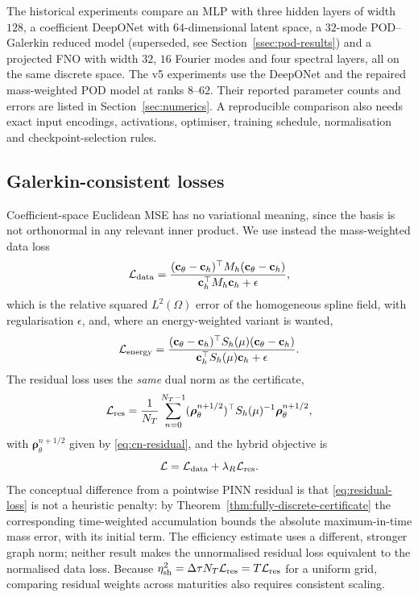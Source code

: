 \documentclass[11pt]{amsart}
\theoremstyle{remark}
\newcommand{\Mh}{M_h}
\newcommand{\Sh}{S_h}
\newcommand{\dt}{\Delta\tau}
\newcommand{\etaSharp}{\eta_{\mathrm{sh}}}
\newcommand{\cc}{\mathbf c}
\newcommand{\rr}{\bm\rho}
\begin{document}
The historical experiments compare an MLP with three hidden layers of width
$128$, a coefficient DeepONet with $64$-dimensional latent space, a
$32$-mode POD--Galerkin reduced model (superseded, see
Section~\ref{ssec:pod-results}) and a projected FNO with width $32$, $16$
Fourier modes and four spectral layers, all on the same discrete space. The
v5 experiments use the DeepONet and the repaired mass-weighted POD model at
ranks $8$--$62$.
Their reported parameter counts and errors are listed in
Section~\ref{sec:numerics}. A reproducible comparison also needs exact
input encodings, activations, optimiser, training schedule, normalisation
and checkpoint-selection rules.

\subsection{Galerkin-consistent losses}
\label{ssec:losses}

Coefficient-space Euclidean MSE has no variational meaning, since the basis is
not orthonormal in any relevant inner product.  We use instead the
mass-weighted data loss
\begin{equation}
 \mathcal L_{\rm data}
 =\frac{(\cc_\theta-\cc_h)^\top\Mh(\cc_\theta-\cc_h)}
        {\cc_h^\top\Mh\cc_h+\epsilon},
 \label{eq:data-loss}
\end{equation}
which is the relative squared $L^2(\Omega)$ error of the homogeneous
spline field, with regularisation $\epsilon$,
and, where an energy-weighted variant is wanted,
\begin{equation}
 \mathcal L_{\rm energy}
 =\frac{(\cc_\theta-\cc_h)^\top\Sh(\mu)(\cc_\theta-\cc_h)}
        {\cc_h^\top\Sh(\mu)\cc_h+\epsilon}.
 \label{eq:energy-loss}
\end{equation}
The residual loss uses the \emph{same} dual norm as the certificate,
\begin{equation}
 \mathcal L_{\rm res}
 =\frac{1}{N_T}\sum_{n=0}^{N_T-1}
 (\rr_\theta^{n+1/2})^\top\Sh(\mu)^{-1}\rr_\theta^{n+1/2},
 \label{eq:residual-loss}
\end{equation}
with $\rr_\theta^{n+1/2}$ given by \eqref{eq:cn-residual}, and the hybrid
objective is
\begin{equation}
 \mathcal L=\mathcal L_{\rm data}+\lambda_R\mathcal L_{\rm res}.
 \label{eq:hybrid-loss}
\end{equation}
The conceptual difference from a pointwise PINN residual is that
\eqref{eq:residual-loss} is not a heuristic penalty: by
Theorem~\ref{thm:fully-discrete-certificate} the corresponding time-weighted accumulation bounds the absolute
maximum-in-time mass error, with its initial term. The efficiency estimate
uses a different, stronger graph norm; neither result makes the unnormalised
residual loss equivalent to the normalised data loss. Because
$\etaSharp^2=\dt N_T\mathcal L_{\rm res}=T\mathcal L_{\rm res}$ for a
uniform grid, comparing residual weights across maturities also requires
consistent scaling.
\end{document}
